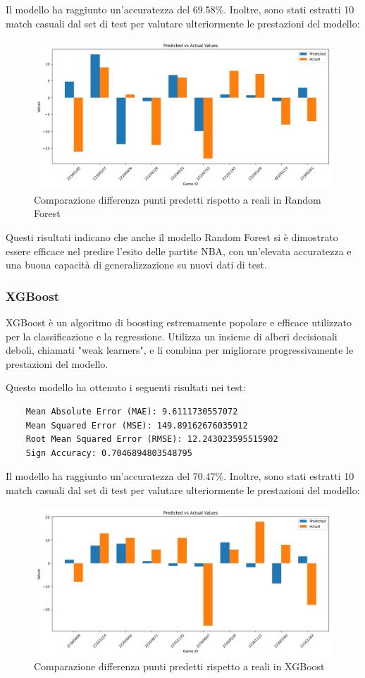 Il modello ha raggiunto un'accuratezza del 69.58\%. Inoltre, sono stati estratti 10 match casuali dal set di test per valutare ulteriormente le prestazioni del modello:

\begin{figure}[H]
    \centering
    \includegraphics[width=0.7\linewidth]{img/random_forest_istogramma.png}
    \caption{Comparazione differenza punti predetti rispetto a reali in Random Forest}
    \label{fig:enter-label}
\end{figure}

Questi risultati indicano che anche il modello Random Forest si è dimostrato essere efficace nel predire l'esito delle partite NBA, con un'elevata accuratezza e una buona capacità di generalizzazione su nuovi dati di test.

\subsubsection{XGBoost}

XGBoost è un algoritmo di boosting estremamente popolare e efficace utilizzato per la classificazione e la regressione. Utilizza un insieme di alberi decisionali deboli, chiamati "weak learners", e li combina per migliorare progressivamente le prestazioni del modello.

Questo modello ha ottenuto i seguenti risultati nei test:

\begin{lstlisting}
    Mean Absolute Error (MAE): 9.6111730557072
    Mean Squared Error (MSE): 149.89162676035912
    Root Mean Squared Error (RMSE): 12.243023595515902
    Sign Accuracy: 0.7046894803548795
\end{lstlisting}

Il modello ha raggiunto un'accuratezza del 70.47\%. Inoltre, sono stati estratti 10 match casuali dal set di test per valutare ulteriormente le prestazioni del modello:

\begin{figure}[H]
    \centering
    \includegraphics[width=0.7\linewidth]{img/xgboost_istogramma.png}
    \caption{Comparazione differenza punti predetti rispetto a reali in XGBoost}
    \label{fig:enter-label}
\end{figure}

